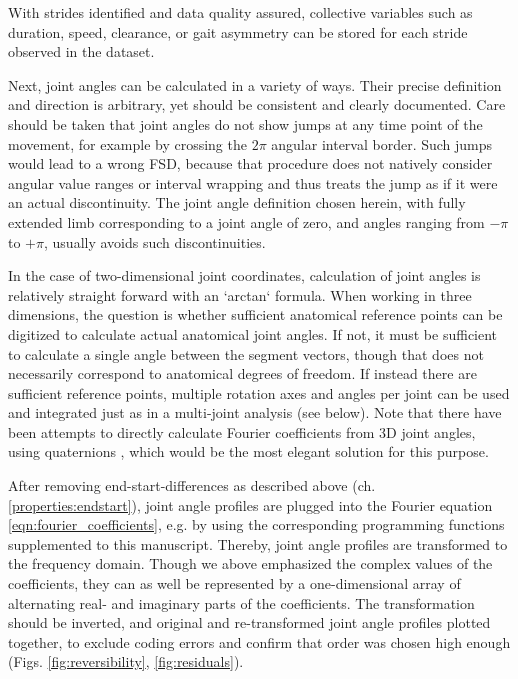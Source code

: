 \documentclass[10pt,a4paper]{article}
\begin{document}
With strides identified and data quality assured, collective variables such as duration, speed, clearance, or gait asymmetry can be stored for each stride observed in the dataset.


Next, joint angles can be calculated in a variety of ways.
Their precise definition and direction is arbitrary, yet should be consistent and clearly documented.
Care should be taken that joint angles do not show jumps at any time point of the movement, for example by crossing the \(2\pi\) angular interval border.
Such jumps would lead to a wrong FSD, because that procedure does not natively consider angular value ranges or interval wrapping and thus treats the jump as if it were an actual discontinuity.
The joint angle definition chosen herein, with fully extended limb corresponding to a joint angle of zero, and angles ranging from \(-\pi\) to \(+\pi\), usually avoids such discontinuities.

In the case of two-dimensional joint coordinates, calculation of joint angles is relatively straight forward with an `arctan` formula.
When working in three dimensions, the question is whether sufficient anatomical reference points can be digitized to calculate actual anatomical joint angles.
If not, it must be sufficient to calculate a single angle between the segment vectors, though that does not necessarily correspond to anatomical degrees of freedom.
If instead there are sufficient reference points, multiple rotation axes and angles per joint can be used and integrated just as in a multi-joint analysis (see below).
Note that there have been attempts to directly calculate Fourier coefficients from 3D joint angles, using quaternions \citep{Kenwright2015}, which would be the most elegant solution for this purpose.


After removing end-start-differences as described above (ch. \ref{properties:endstart}), joint angle profiles are plugged into the Fourier equation \eqref{eqn:fourier_coefficients}, e.g. by using the corresponding programming functions supplemented to this manuscript.
Thereby, joint angle profiles are transformed to the frequency domain.
Though we above emphasized the complex values of the coefficients, they can as well be represented by a one-dimensional array of alternating real- and imaginary parts of the coefficients.
The transformation should be inverted, and original and re-transformed joint angle profiles plotted together, to exclude coding errors and confirm that order was chosen high enough (Figs. \ref{fig:reversibility}, \ref{fig:residuals}).
\end{document}
